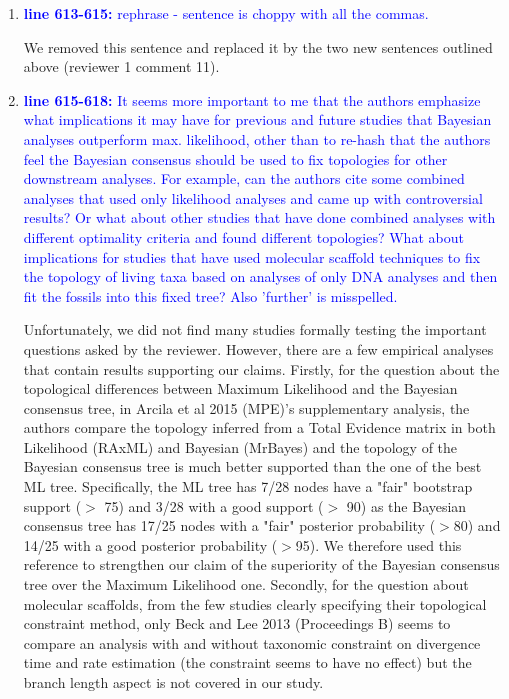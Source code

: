 \documentclass[12pt,letterpaper]{article}
\begin{document}
\begin{enumerate}
\item{\textcolor{blue}{\textbf{line 613-615:} rephrase - sentence is choppy with all the commas. }}

We removed this sentence and replaced it by the two new sentences outlined above (reviewer 1 comment 11).

\item{\textcolor{blue}{\textbf{line 615-618:} It seems more important to me that the authors emphasize what implications it may have for previous and future studies that Bayesian analyses outperform max. likelihood, other than to re-hash that the authors feel the Bayesian consensus should be used to fix topologies for other downstream analyses.
For example, can the authors cite some combined analyses that used only likelihood analyses and came up with controversial results?
Or what about other studies that have done combined analyses with different optimality criteria and found different topologies?
What about implications for studies that have used molecular scaffold techniques to fix the topology of living taxa based on analyses of only DNA analyses and then fit the fossils into this fixed tree?
Also 'further' is misspelled.  }}

Unfortunately, we did not find many studies formally testing the important questions asked by the reviewer. However, there are a few empirical analyses that contain results supporting our claims.
Firstly, for the question about the topological differences between Maximum Likelihood and the Bayesian consensus tree, in Arcila et al 2015 (MPE)'s supplementary analysis, the authors compare the topology inferred from a Total Evidence matrix in both Likelihood (RAxML) and Bayesian (MrBayes) and the topology of the Bayesian consensus tree is much better supported than the one of the best ML tree. Specifically, the ML tree has 7/28 nodes have a "fair" bootstrap support ($>$ 75) and 3/28 with a good support ($>$ 90) as the Bayesian consensus tree has 17/25 nodes with a "fair" posterior probability ($>$80) and 14/25 with a good posterior probability ($>$95). We therefore used this reference to strengthen our claim of the superiority of the Bayesian consensus tree over the Maximum Likelihood one.
Secondly, for the question about molecular scaffolds, from the few studies clearly specifying their topological constraint method, only Beck and Lee 2013 (Proceedings B) seems to compare an analysis with and without taxonomic constraint on divergence time and rate estimation (the constraint seems to have no effect) but the branch length aspect is not covered in our study.


\end{enumerate}
\end{document}

